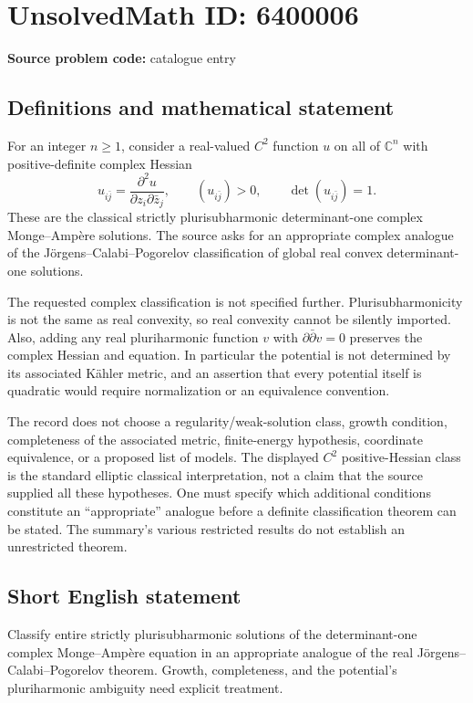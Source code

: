 \documentclass[11pt]{article}
\newcommand{\C}{\mathbb{C}}
\begin{document}
\section*{UnsolvedMath ID: 6400006}
\textbf{Source problem code:} catalogue entry
\subsection{Definitions and mathematical statement}
For an integer $n\geq1$, consider a real-valued $C^2$ function $u$ on all of $\C^n$ with positive-definite complex Hessian
\[
u_{i\bar j}=\frac{\partial^2u}{\partial z_i\partial\bar z_j},\qquad
(u_{i\bar j})>0,\qquad \det(u_{i\bar j})=1.
\]
These are the classical strictly plurisubharmonic determinant-one complex Monge--Amp\`ere solutions. The source asks for an appropriate complex analogue of the J\"orgens--Calabi--Pogorelov classification of global real convex determinant-one solutions.

The requested complex classification is not specified further. Plurisubharmonicity is not the same as real convexity, so real convexity cannot be silently imported. Also, adding any real pluriharmonic function $v$ with $\partial\bar\partial v=0$ preserves the complex Hessian and equation. In particular the potential is not determined by its associated K\"ahler metric, and an assertion that every potential itself is quadratic would require normalization or an equivalence convention.

The record does not choose a regularity/weak-solution class, growth condition, completeness of the associated metric, finite-energy hypothesis, coordinate equivalence, or a proposed list of models. The displayed $C^2$ positive-Hessian class is the standard elliptic classical interpretation, not a claim that the source supplied all these hypotheses. One must specify which additional conditions constitute an ``appropriate'' analogue before a definite classification theorem can be stated. The summary's various restricted results do not establish an unrestricted theorem.
\subsection{Short English statement}
Classify entire strictly plurisubharmonic solutions of the determinant-one complex Monge--Amp\`ere equation in an appropriate analogue of the real J\"orgens--Calabi--Pogorelov theorem. Growth, completeness, and the potential's pluriharmonic ambiguity need explicit treatment.
\end{document}
